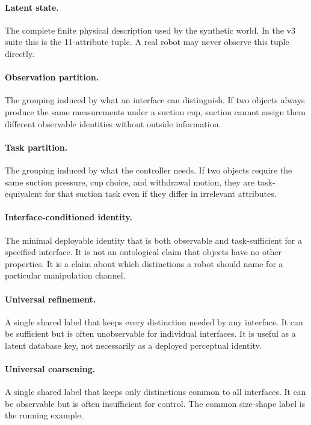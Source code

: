 \documentclass{article}
\begin{document}
\paragraph{Latent state.}
The complete finite physical description used by the synthetic world.
In the v3 suite this is the 11-attribute tuple.
A real robot may never observe this tuple directly.

\paragraph{Observation partition.}
The grouping induced by what an interface can distinguish.
If two objects always produce the same measurements under a suction cup, suction cannot assign them different observable identities without outside information.

\paragraph{Task partition.}
The grouping induced by what the controller needs.
If two objects require the same suction pressure, cup choice, and withdrawal motion, they are task-equivalent for that suction task even if they differ in irrelevant attributes.

\paragraph{Interface-conditioned identity.}
The minimal deployable identity that is both observable and task-sufficient for a specified interface.
It is not an ontological claim that objects have no other properties.
It is a claim about which distinctions a robot should name for a particular manipulation channel.

\paragraph{Universal refinement.}
A single shared label that keeps every distinction needed by any interface.
It can be sufficient but is often unobservable for individual interfaces.
It is useful as a latent database key, not necessarily as a deployed perceptual identity.

\paragraph{Universal coarsening.}
A single shared label that keeps only distinctions common to all interfaces.
It can be observable but is often insufficient for control.
The common size-shape label is the running example.
\end{document}
